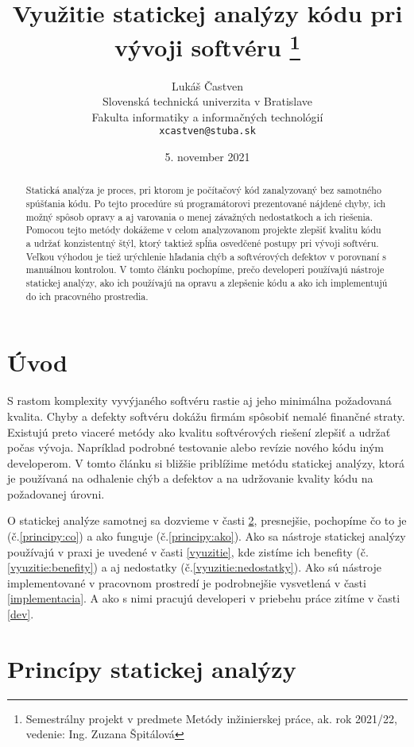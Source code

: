 \documentclass[11pt,twoside,slovak,a4paper]{article}
\title{Využitie statickej analýzy kódu pri vývoji softvéru
\thanks{Semestrálny projekt v predmete Metódy inžinierskej práce, ak. rok 2021/22, vedenie: Ing. Zuzana Špitálová}}
\author{Lukáš Častven\\[2pt]
	{\small Slovenská technická univerzita v Bratislave}\\
	{\small Fakulta informatiky a informačných technológií}\\
	{\small \texttt{xcastven@stuba.sk}}
	}
\date{\small  5. november 2021}
\begin{document}
\maketitle

\begin{abstract}
	Statická analýza je proces, pri ktorom je počítačový kód zanalyzovaný bez samotného spúšťania kódu.
	Po tejto procedúre sú programátorovi prezentované nájdené chyby, ich možný spôsob opravy a aj varovania
	o menej závažných nedostatkoch a ich riešenia. Pomocou tejto metódy dokážeme v celom analyzovanom projekte
	zlepšiť kvalitu kódu a udržať konzistentný štýl, ktorý taktiež spĺňa osvedčené postupy pri vývoji softvéru.
	Veľkou výhodou je tiež urýchlenie hľadania chýb a softvérových defektov v porovnaní s manuálnou kontrolou.
	V tomto článku pochopíme, prečo developeri používajú nástroje statickej analýzy, ako ich používajú
	na opravu a zlepšenie kódu a ako ich implementujú do ich pracovného prostredia.
\end{abstract}

\pagestyle{plain}

\section{Úvod}
S rastom komplexity vyvýjaného softvéru rastie aj jeho minimálna požadovaná kvalita. Chyby a defekty softvéru
dokážu firmám spôsobiť nemalé finančné straty. Existujú preto viaceré metódy ako kvalitu softvérových riešení zlepšiť
a udržať počas vývoja. Napríklad podrobné testovanie alebo revízie nového kódu iným developerom. V tomto článku si
bližšie priblížime metódu statickej analýzy, ktorá je používaná na odhalenie chýb a defektov a na udržovanie kvality
kódu na požadovanej úrovni.\cite{BrittanyJohnson,LisaNguyen}

O statickej analýze samotnej sa dozvieme v časti \ref{principy}, presnejšie, pochopíme čo to je (č.\ref{principy:co}) a
ako funguje (č.\ref{principy:ako}). Ako sa nástroje statickej analýzy používajú v praxi je uvedené v časti
\ref{vyuzitie}, kde zistíme ich benefity (č.\ref{vyuzitie:benefity}) a aj nedostatky (č.\ref{vyuzitie:nedostatky}).
Ako sú nástroje implementované v pracovnom prostredí je podrobnejšie vysvetlená v časti \ref{implementacia}. A ako s
nimi pracujú developeri v priebehu práce zitíme v časti \ref{dev}.

\pagebreak

\section{Princípy statickej analýzy} \label{principy}
\end{document}
